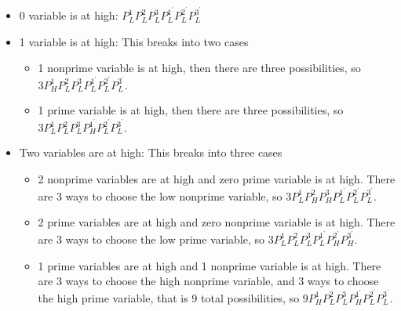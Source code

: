 \documentclass[12pt,letterpaper,leqno]{amsart}
\theoremstyle{plain}
\numberwithin{equation}{section}
\numberwithin{theorem}{section}
\numberwithin{proposition}{section}
\numberwithin{lemma}{section}
\numberwithin{corollary}{section}
\begin{document}
\begin{itemize}
\item 0 variable is at high: $P_{L}^{1}P_{L}^{2}P_{L}^{3}P_{L}^{1^{\prime
}}P_{L}^{2^{\prime }}P_{L}^{3^{\prime }}$

\item 1 variable is at high: This breaks into two cases

\begin{itemize}
\item 1 nonprime variable is at high, then there are three possibilities, so 
$3P_{H}^{1}P_{L}^{2}P_{L}^{3}P_{L}^{1^{\prime }}P_{L}^{2^{\prime
}}P_{L}^{3^{\prime }}.$

\item 1 prime variable is at high, then there are three possibilities, so $%
3P_{L}^{1}P_{L}^{2}P_{L}^{3}P_{H}^{1^{\prime }}P_{L}^{2^{\prime
}}P_{L}^{3^{\prime }}.$
\end{itemize}

\item Two variables are at high: This breaks into three cases

\begin{itemize}
\item 2 nonprime variables are at high and zero prime variable is at high.
There are 3 ways to choose the low nonprime variable, so $%
3P_{L}^{1}P_{H}^{2}P_{H}^{3}P_{L}^{1^{\prime }}P_{L}^{2^{\prime
}}P_{L}^{3^{\prime }}.$

\item 2 prime variables are at high and zero nonprime variable is at high.
There are 3 ways to choose the low prime variable, so $%
3P_{L}^{1}P_{L}^{2}P_{L}^{3}P_{L}^{1^{\prime }}P_{H}^{2^{\prime
}}P_{H}^{3^{\prime }}.$

\item 1 prime variables are at high and 1 nonprime variable is at high.
There are 3 ways to choose the high nonprime variable, and 3 ways to choose
the high prime variable, that is 9 total possibilities, so $%
9P_{H}^{1}P_{L}^{2}P_{L}^{3}P_{H}^{1^{\prime }}P_{L}^{2^{\prime
}}P_{L}^{3^{\prime }}.$
\end{itemize}
\end{itemize}
\end{document}
